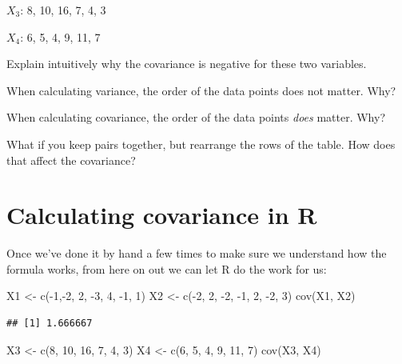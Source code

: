\documentclass[
]{book}
\newenvironment{Shaded}{\begin{snugshade}}{\end{snugshade}}
\newcommand{\DecValTok}[1]{\textcolor[rgb]{0.00,0.00,0.81}{#1}}
\newcommand{\FunctionTok}[1]{\textcolor[rgb]{0.00,0.00,0.00}{#1}}
\newcommand{\NormalTok}[1]{#1}
\newcommand{\OtherTok}[1]{\textcolor[rgb]{0.56,0.35,0.01}{#1}}
\newcommand{\SpecialCharTok}[1]{\textcolor[rgb]{0.00,0.00,0.00}{#1}}
\begin{document}
\(X_{3}\): 8, 10, 16, 7, 4, 3

\(X_{4}\): 6, 5, 4, 9, 11, 7

Explain intuitively why the covariance is negative for these two variables.

When calculating variance, the order of the data points does not matter. Why?

When calculating covariance, the order of the data points \emph{does} matter. Why?

What if you keep pairs together, but rearrange the rows of the table. How does that affect the covariance?

\hypertarget{covariance-r}{%
\section{Calculating covariance in R}\label{covariance-r}}

Once we've done it by hand a few times to make sure we understand how the formula works, from here on out we can let R do the work for us:

\begin{Shaded}
\begin{Highlighting}[]
\NormalTok{X1 }\OtherTok{\textless{}{-}} \FunctionTok{c}\NormalTok{(}\SpecialCharTok{{-}}\DecValTok{1}\NormalTok{,}\SpecialCharTok{{-}}\DecValTok{2}\NormalTok{, }\DecValTok{2}\NormalTok{, }\SpecialCharTok{{-}}\DecValTok{3}\NormalTok{, }\DecValTok{4}\NormalTok{, }\SpecialCharTok{{-}}\DecValTok{1}\NormalTok{, }\DecValTok{1}\NormalTok{)}
\NormalTok{X2 }\OtherTok{\textless{}{-}} \FunctionTok{c}\NormalTok{(}\SpecialCharTok{{-}}\DecValTok{2}\NormalTok{, }\DecValTok{2}\NormalTok{, }\SpecialCharTok{{-}}\DecValTok{2}\NormalTok{, }\SpecialCharTok{{-}}\DecValTok{1}\NormalTok{, }\DecValTok{2}\NormalTok{, }\SpecialCharTok{{-}}\DecValTok{2}\NormalTok{, }\DecValTok{3}\NormalTok{)}
\FunctionTok{cov}\NormalTok{(X1, X2)}
\end{Highlighting}
\end{Shaded}

\begin{verbatim}
## [1] 1.666667
\end{verbatim}

\begin{Shaded}
\begin{Highlighting}[]
\NormalTok{X3 }\OtherTok{\textless{}{-}} \FunctionTok{c}\NormalTok{(}\DecValTok{8}\NormalTok{, }\DecValTok{10}\NormalTok{, }\DecValTok{16}\NormalTok{, }\DecValTok{7}\NormalTok{, }\DecValTok{4}\NormalTok{, }\DecValTok{3}\NormalTok{)}
\NormalTok{X4 }\OtherTok{\textless{}{-}} \FunctionTok{c}\NormalTok{(}\DecValTok{6}\NormalTok{, }\DecValTok{5}\NormalTok{, }\DecValTok{4}\NormalTok{, }\DecValTok{9}\NormalTok{, }\DecValTok{11}\NormalTok{, }\DecValTok{7}\NormalTok{)}
\FunctionTok{cov}\NormalTok{(X3, X4)}
\end{Highlighting}
\end{Shaded}
\end{document}
